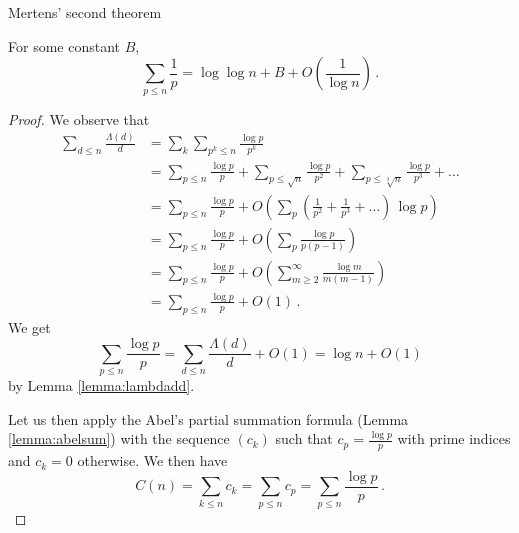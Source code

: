 \documentclass{article}
\begin{document}
\begin{theorem}
Mertens' second theorem \emph{\cite{Goldmakher}}
\label{thm:mertens32}

For some constant $B$,
\begin{equation*}
    \sum_{p\leq n}\frac{1}{p} = \log\log n + B + O\left(\frac{1}{\log n}\right)\,.
\end{equation*}

\begin{proof}
We observe that
\begin{align*}
    \sum_{d\leq n} \frac{\Lambda(d)}{d} & = \sum_k \sum_{p^k\leq n} \frac{\log p}{p^k}\\
    & = \sum_{p\leq n} \frac{\log p}{p} + \sum_{p\leq \sqrt{n}} \frac{\log p}{p^2} + \sum_{p\leq \sqrt[3]{n}} \frac{\log p}{p^3} + \dots\\
    & = \sum_{p\leq n} \frac{\log p}{p} + O\left(\sum_p \left(\frac{1}{p^2}+\frac{1}{p^3}+\dots\right)\,\log p\right)\\
    & = \sum_{p\leq n} \frac{\log p}{p} + O\left(\sum_p \frac{\log p}{p(p-1)}\right)\\
    & = \sum_{p\leq n} \frac{\log p}{p} + O\left(\sum_{m\geq2}^\infty \frac{\log m}{m(m-1)}\right)\\
    & = \sum_{p\leq n} \frac{\log p}{p} + O(1)\,.
\end{align*}
We get
\begin{equation*}
    \sum_{p\leq n} \frac{\log p}{p} = \sum_{d\leq n} \frac{\Lambda(d)}{d} + O(1) = \log n + O(1)
\end{equation*}
by Lemma \ref{lemma:lambdadd}.

Let us then apply the Abel's partial summation formula (Lemma \ref{lemma:abelsum}) with the sequence $(c_k)$ such that $c_p=\frac{\log p}{p}$ with prime indices and $c_k=0$ otherwise. We then have
\begin{equation*}
    C(n) = \sum_{k\leq n} c_k = \sum_{p\leq n} c_p = \sum_{p\leq n} \frac{\log p}{p}\,.
\end{equation*}


\end{proof}
\end{theorem}
\end{document}
